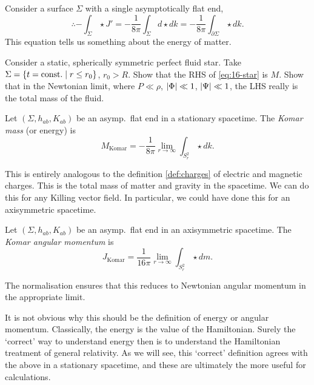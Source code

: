 Consider a surface $\Sigma$ with a single asymptotically flat end, 
\begin{equation}
  \label{eq:16-star}
  \therefore -\int_\Sigma \star J' = -\frac{1}{8 \pi} \int_\Sigma d \star d k = -\frac{1}{8 \pi} \int_{\partial \Sigma} \star dk.
\end{equation}
This equation tells us something about the energy of matter.
\begin{exercise}
  Consider a static, spherically symmetric perfect fluid star. Take $\Sigma = \{t = \text{const.} \suchthat r \leq r_0\}$, $r_0 > R$.
  Show that the RHS of \eqref{eq:16-star} is $M$.
  Show that in the Newtonian limit, where $P \ll \rho$, $\abs{\Phi} \ll 1$, $\abs{\Psi} \ll 1$, the LHS really is the total mass of the fluid.
\end{exercise}

\begin{definition}
  Let $(\Sigma, h_{ab}, K_{ab})$ be an asymp.~flat end in a stationary spacetime. The \emph{Komar mass} (or energy) is
  \begin{equation}
    M_{\text{Komar}} = -\frac{1}{8\pi} \lim_{r \to \infty}  \int_{S^2_r} \star dk.
  \end{equation}
\end{definition}
This is entirely analogous to the definition \ref{def:charges} of electric and magnetic charges.
This is the total mass of matter and gravity in the spacetime.
We can do this for any Killing vector field. In particular, we could have done this for an axisymmetric spacetime.
\begin{definition}
  Let $(\Sigma, h_{ab}, K_{ab})$ be an asymp.~flat end in an axisymmetric spacetime. The \emph{Komar angular momentum} is
  \begin{equation}
    J_{\text{Komar}} = \frac{1}{16 \pi} \lim_{r \to \infty}  \int_{S^2_r} \star dm.
  \end{equation}
\end{definition}
The normalisation ensures that this reduces to Newtonian angular momentum in the appropriate limit.

It is not obvious why this should be the definition of energy or angular momentum.
Classically, the energy is the value of the Hamiltonian. Surely the `correct' way to understand energy then is to understand the Hamiltonian treatment of general relativity.
As we will see, this `correct' definition agrees with the above in a stationary spacetime, and these are ultimately the more useful for calculations.

